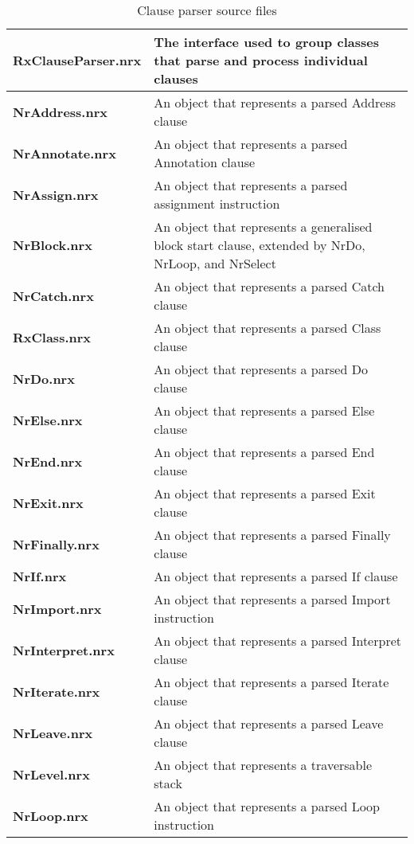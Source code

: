 \begin{table}\caption{Clause parser source files}
\begin{tabularx}{\textwidth}{>{\bfseries}lX}
    \toprule
    RxClauseParser.nrx  &The interface used to group classes that parse and process individual clauses
    \\\midrule
    NrAddress.nrx   &An object that represents a parsed Address clause
    \\\midrule
    NrAnnotate.nrx  &An object that represents a parsed Annotation clause
    \\\midrule
    NrAssign.nrx    &An object that represents a parsed assignment instruction
    \\\midrule
    NrBlock.nrx     &An object that represents a generalised block start clause, extended by NrDo, NrLoop, and NrSelect
    \\\midrule
    NrCatch.nrx     &An object that represents a parsed Catch clause
    \\\midrule
    RxClass.nrx     &An object that represents a parsed Class clause
    \\\midrule
    NrDo.nrx        &An object that represents a parsed Do clause
    \\\midrule
    NrElse.nrx      &An object that represents a parsed Else clause
    \\\midrule
    NrEnd.nrx       &An object that represents a parsed End clause
    \\\midrule
    NrExit.nrx      &An object that represents a parsed Exit clause
    \\\midrule
    NrFinally.nrx   &An object that represents a parsed Finally clause
    \\\midrule
    NrIf.nrx        &An object that represents a parsed If clause
    \\\midrule
    NrImport.nrx    &An object that represents a parsed Import instruction
    \\\midrule
    NrInterpret.nrx &An object that represents a parsed Interpret clause
    \\\midrule
    NrIterate.nrx   &An object that represents a parsed Iterate clause
    \\\midrule
    NrLeave.nrx     &An object that represents a parsed Leave clause
    \\\midrule
    NrLevel.nrx     &An object that represents a traversable stack
    \\\midrule
    NrLoop.nrx      &An object that represents a parsed Loop instruction
    \\\midrule

\end{tabularx}
\end{table}
